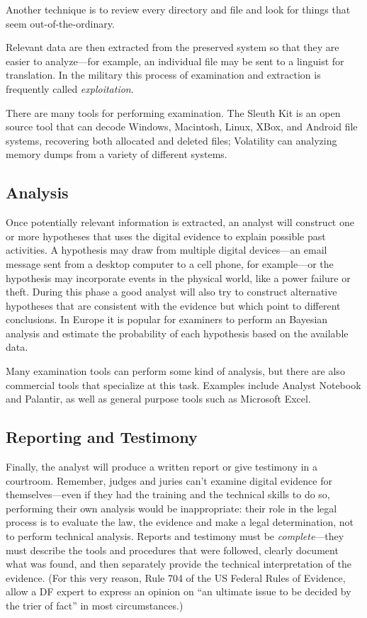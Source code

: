 \documentclass[11pt,letter]{article}
\begin{document}
 Another 
  technique is to review every directory and file and look for
  things that seem out-of-the-ordinary. 

Relevant data are then
  extracted from the preserved system so that they are easier to
  analyze---for example, an individual file may be sent to a linguist
  for translation. In the military this process of examination and extraction
  is frequently called \emph{exploitation}.

  There are many tools for performing examination. The Sleuth Kit\cite{sleuthkit} is
  an open source tool that can decode Windows, Macintosh, Linux, XBox,
  and Android
  file systems, recovering both allocated and deleted
  files;   Volatility\cite{volatility} can analyzing memory dumps from a
  variety of different systems.

\subsection{Analysis} Once potentially relevant information is
  extracted, an analyst will construct one or more hypotheses that
  uses the digital evidence to explain possible past activities. A
  hypothesis may draw from multiple digital devices---an email message
  sent from a desktop computer to a cell phone, for example---or the
  hypothesis may incorporate events in the physical world, like a
  power failure or theft. During this phase a good analyst will also
  try to construct alternative hypotheses that are consistent with the
  evidence but which point to different conclusions. In Europe it is
  popular for examiners to perform an Bayesian analysis and estimate
  the probability of each hypothesis based on the available data.

  Many examination tools can perform some kind of analysis, but there
  are also commercial tools that specialize at this task. Examples
  include Analyst Notebook\cite{analysts_notebook} and
  Palantir\cite{palantir}, as well as general purpose tools such as
  Microsoft Excel.

\subsection{Reporting and Testimony} Finally, the analyst will
  produce a written report or give testimony in a courtroom. Remember,
  judges and juries can't examine digital evidence for
  themselves---even if they had the training and the technical skills
  to do so, performing their own analysis would be inappropriate:
  their role in the legal process is to evaluate the law, the evidence
  and make a legal determination, not to perform technical
  analysis. Reports and testimony must be
  \emph{complete}---they must describe the tools and procedures
  that were followed, clearly document what was found, and then
  separately provide the technical interpretation of the
  evidence. (For this very reason, Rule 704 of the US Federal Rules of
  Evidence, allow a DF expert to
  express an opinion on ``an ultimate issue to be decided by the trier
  of fact'' in most circumstances.)
\end{document}
